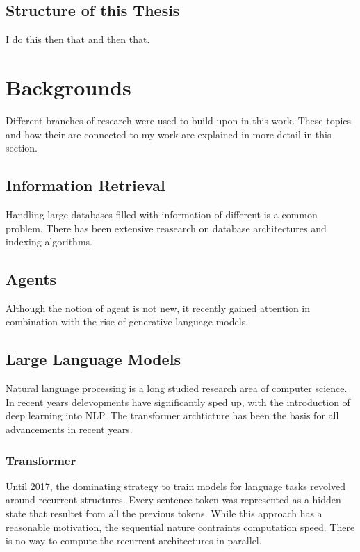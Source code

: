 \documentclass[english, version-2022-01]{uzl-thesis}
\begin{document}
\section{Structure of this Thesis}
I do this then that and then that.

\chapter{Backgrounds}

Different branches of research were used to build upon in this work. These topics and how their are connected to my work are explained in more detail in this section.
\section{Information Retrieval}

Handling large databases filled with information of different is a common problem. There has been extensive reasearch on database architectures and indexing algorithms.

\section{Agents}

Although the notion of agent is not new, it recently gained attention in combination with the rise of generative language models.
\section{Large Language Models}

Natural language processing is a long studied research area of computer science. In recent years delevopments have significantly sped up, with the introduction of deep learning into NLP. The transformer archticture has been the basis for all advancements in recent years.

\subsection{Transformer}
Until 2017, the dominating strategy to train models for language tasks revolved around recurrent structures. Every sentence token was represented as a hidden state that resultet from all the previous tokens. While this approach has a reasonable motivation, the sequential nature contraints computation speed. There is no way to compute the recurrent architectures in parallel.
\end{document}

